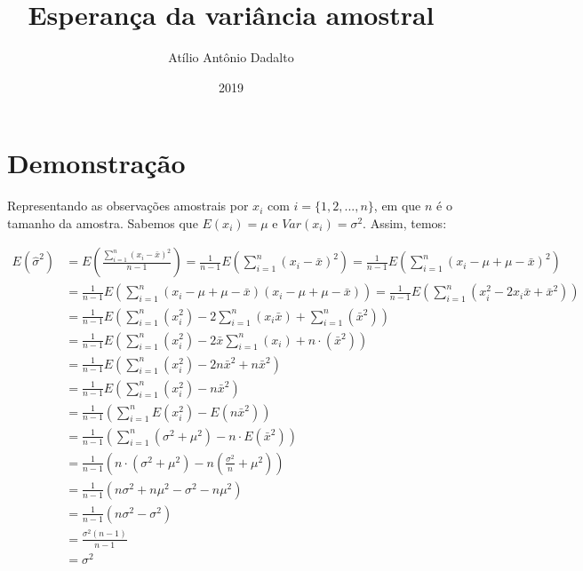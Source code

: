 \documentclass[11pt]{article}
\title{Esperança da variância amostral}
\author{Atílio Antônio Dadalto}
\date{2019}
\begin{document}
\maketitle

\section{Demonstração}
Representando as observações amostrais por $x_i$ com $i = \{1, 2, ..., n\}$, em que $n$ é o tamanho da amostra. Sabemos que $E(x_i) = \mu$ e $Var(x_i) = \sigma^2$. Assim, temos:

\begin{align*}
    E(\hat{\sigma}^2) &= E\left(\frac{\sum \limits_{i = 1}^{n} (x_i - \bar{x})^2}{n - 1}\right) = \frac{1}{n - 1} E\left(\sum \limits_{i = 1}^{n} (x_i - \bar{x})^2\right) = \frac{1}{n - 1} E\left(\sum \limits_{i = 1}^{n} (x_i - \mu + \mu - \bar{x})^2\right)\\
    &= \frac{1}{n - 1} E\left(\sum \limits_{i = 1}^{n} (x_i - \mu + \mu - \bar{x}) (x_i - \mu + \mu - \bar{x})\right) = \frac{1}{n - 1} E\left(\sum \limits_{i = 1}^{n} (x_i^2 - 2x_i\bar{x} + \bar{x}^2)\right)\\
    &= \frac{1}{n - 1} E\left(\sum \limits_{i = 1}^{n} (x_i^2) - 2\sum \limits_{i = 1}^{n} (x_i\bar{x}) + \sum \limits_{i = 1}^{n} (\bar{x}^2)\right)\\
    &= \frac{1}{n - 1} E\left(\sum \limits_{i = 1}^{n} (x_i^2) - 2\bar{x}\sum \limits_{i = 1}^{n} (x_i) + n \cdot (\bar{x}^2)\right)\\
    &= \frac{1}{n - 1} E\left(\sum \limits_{i = 1}^{n} (x_i^2) - 2n\bar{x}^2 + n\bar{x}^2 \right)\\
    &= \frac{1}{n - 1} E\left(\sum \limits_{i = 1}^{n} (x_i^2) - n\bar{x}^2 \right)\\
    &= \frac{1}{n - 1} \left(\sum \limits_{i = 1}^{n} E(x_i^2) - E(n\bar{x}^2)\right)\\
    &= \frac{1}{n - 1} \left(\sum \limits_{i = 1}^{n} (\sigma^2 + \mu^2) - n \cdot E(\bar{x}^2) \right)\\
    &= \frac{1}{n - 1} \left(n \cdot (\sigma^2 + \mu^2) - n \left(\frac{\sigma^2}{n} + \mu^2\right) \right)\\
    &= \frac{1}{n - 1} \left(n\sigma^2 + n\mu^2 - \sigma^2 - n\mu^2 \right)\\[0.5em]
    &= \frac{1}{n - 1} \left(n\sigma^2 - \sigma^2 \right)\\[0.5em]
    &= \frac{\sigma^2(n - 1)}{n - 1}\\[0.5em]
    &= \sigma^2
\end{align*}
\end{document}
